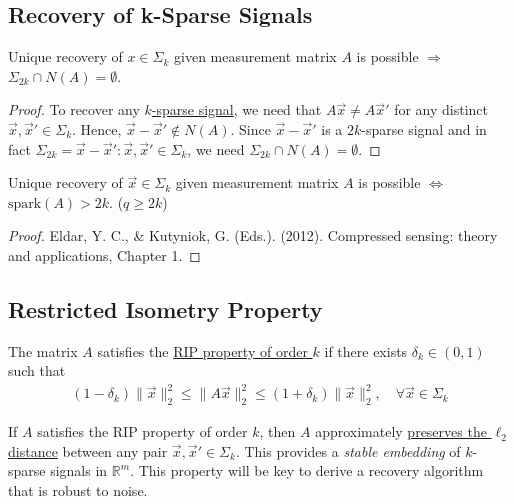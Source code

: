 \documentclass[11pt]{elegantbook}
\begin{document}
\subsection{Recovery of k-Sparse Signals}
\begin{lemma}
    Unique recovery of $x \in \Sigma_k$ given measurement matrix $A$ is possible $\Rightarrow$ $\Sigma_{2k} \cap N(A) = \emptyset$.
\end{lemma}
\begin{proof}
    To recover any \underline{$k$-sparse signal}, we need that $A\vec{x} \neq A\vec{x}'$ for any distinct $\vec{x},\vec{x}' \in \Sigma_k$. Hence, $\vec{x}-\vec{x}' \notin N(A)$. Since $\vec{x}-\vec{x}'$ is a $2k$-sparse signal and in fact $\Sigma_{2k} ={\vec{x}-\vec{x}' : \vec{x},\vec{x}'\in \Sigma_k}$, we need $\Sigma_{2k} \cap N(A) = \emptyset$.
\end{proof}

\begin{theorem}
    Unique recovery of $\vec{x} \in \Sigma_k$ given measurement matrix $A$ is possible $\Leftrightarrow$ $\text{spark}(A)> 2k$. ($q\geq 2k$)
\end{theorem}
\begin{proof}
Eldar, Y. C., \& Kutyniok, G. (Eds.). (2012). Compressed sensing: theory and applications, Chapter 1.
\end{proof}

\subsection{Restricted Isometry Property}
\begin{definition}
    The matrix $A$ satisfies the \underline{RIP property of order $k$} if there exists $\delta_k \in (0, 1)$ such that
    \begin{equation}
        \begin{aligned}
            (1-\delta_k)\|\vec{x}\|^2_2\leq\|A\vec{x}\|_2^2\leq (1+\delta_k)\|\vec{x}\|^2_2,\quad \forall \vec{x}\in \Sigma_k
        \end{aligned}
        \nonumber
    \end{equation}
\end{definition}
If $A$ satisfies the RIP property of order $k$, then $A$ approximately \underline{preserves the $\ell_2$ distance} between any pair $\vec{x},\vec{x}' \in \Sigma_k$. This provides a \textit{stable embedding} of $k$-sparse signals in $\mathbb{R}^m$. This property will be key to derive a recovery algorithm that is robust to noise.
\end{document}
